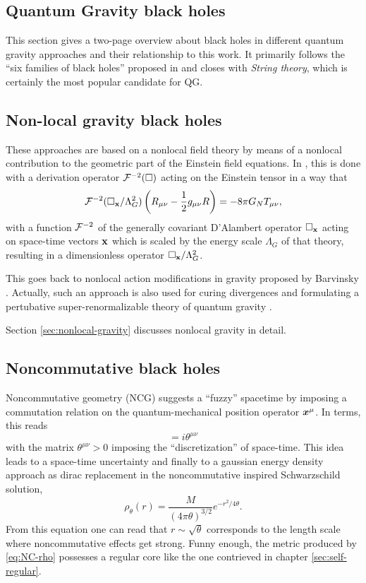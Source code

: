 \documentclass[12pt,a4paper]{report}
\numberwithin{equation}{chapter}
\begin{document}
\begin{appendices}
\newpage
\section{Quantum Gravity black holes}\label{sec:apx-qgbhs}
This section gives a two-page overview about black holes in different quantum gravity approaches and their relationship to this work. It primarily follows the ``six families of black holes'' proposed in \cite{Winstanley2011} and closes with \emph{String theory}, which is certainly the most popular candidate for QG.

\subsection{Non-local gravity black holes}
These approaches are based on a nonlocal field theory by means of a nonlocal contribution to the geometric part of the Einstein field equations. In \cite{MMN2010,NAug2010}, this is done with a derivation operator ${\cal F}^{-2}(\square)$ acting on the Einstein tensor in a way that
\begin{equation}
{\cal F}^{-2}(\square_{\bf x} / \Lambda_G^2) \left( R_{\mu\nu} - \frac 12 g_{\mu\nu} R \right) = -8\pi G_N T_{\mu\nu},
\end{equation}
with a function ${\cal F}^{-2}$ of the generally covariant D'Alambert operator $\square_{\bf x}$ acting on space-time vectors $\bf x$ which is scaled by the energy scale $\Lambda_G$ of that theory, resulting in a dimensionless operator $\square_{\bf x}/\Lambda_G^2$.

This goes back to nonlocal action modifications in gravity proposed by Barvinsky \cite{Barvinsky2003,Barvinsky2014}. Actually, such an approach is also used for curing divergences and formulating a pertubative super-renormalizable theory of quantum gravity \cite{Modesto:2011kw}.

Section \ref{sec:nonlocal-gravity} discusses nonlocal gravity in detail.

\subsection{Noncommutative black holes}
Noncommutative geometry (NCG) suggests a ``fuzzy'' spacetime by imposing a commutation relation on the quantum-mechanical position operator $\boldsymbol{ x }^\mu$. In terms, this reads
\begin{equation}
[\bv x^\mu, \bv x^\nu] = i \theta^{\mu\nu}
\end{equation}
with the matrix $\theta ^{\mu\nu} > 0$ imposing the ``discretization'' of space-time. This idea leads to a space-time uncertainty and finally to a gaussian energy density approach as dirac replacement in the noncommutative inspired Schwarzschild solution,
\begin{equation}\label{eq:NC-rho}
\rho_\theta(r) = \frac{M}{(4\pi\theta)^{3/2}} e^{-r^2 / 4\theta}.
\end{equation}
From this equation one can read that $r \sim \sqrt{\theta}$ corresponds to the length scale where noncommutative effects get strong. Funny enough, the metric produced by \eqref{eq:NC-rho} possesses a regular core \cite{NSS2006} like the one contrieved in chapter \ref{sec:self-regular}.


\end{appendices}
\end{document}

